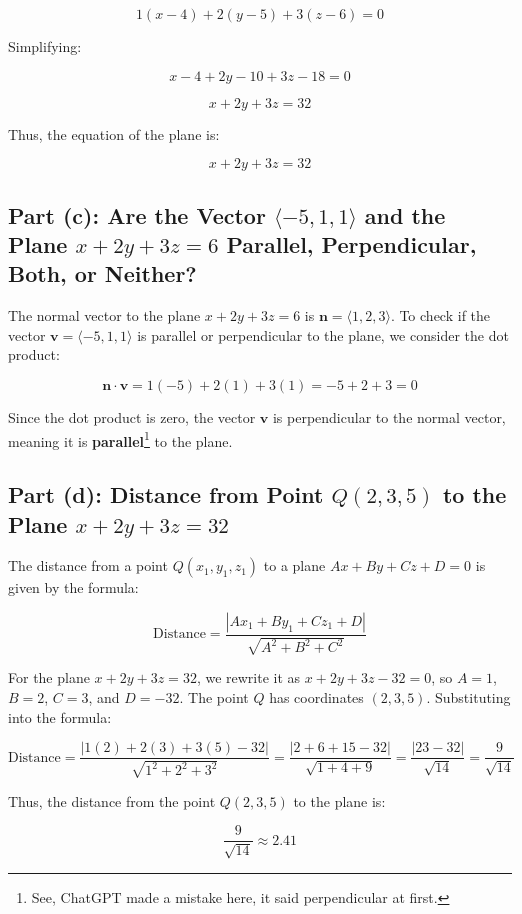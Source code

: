 \documentclass[11pt]{article}
\begin{document}
\[
1(x - 4) + 2(y - 5) + 3(z - 6) = 0
\]

Simplifying:

\[
x - 4 + 2y - 10 + 3z - 18 = 0
\]

\[
x + 2y + 3z = 32
\]

Thus, the equation of the plane is:

\[
x + 2y + 3z = 32
\]

\newpage
\subsection{Part (c): Are the Vector $\langle -5, 1, 1 \rangle$ and the Plane $x + 2y + 3z = 6$ Parallel, Perpendicular, Both, or Neither?}

The normal vector to the plane $x + 2y + 3z = 6$ is $\mathbf{n} = \langle 1, 2, 3 \rangle$. To check if the vector $\mathbf{v} = \langle -5, 1, 1 \rangle$ is parallel or perpendicular to the plane, we consider the dot product:

\[
\mathbf{n} \cdot \mathbf{v} = 1(-5) + 2(1) + 3(1) = -5 + 2 + 3 = 0
\]

Since the dot product is zero, the vector $\mathbf{v}$ is perpendicular to the normal vector, meaning it is \textbf{parallel}\footnote{See, ChatGPT made a mistake here, it said perpendicular at first.} to the plane.

\newpage
\subsection{Part (d): Distance from Point $Q(2, 3, 5)$ to the Plane $x + 2y + 3z = 32$}

The distance from a point $Q(x_1, y_1, z_1)$ to a plane $Ax + By + Cz + D = 0$ is given by the formula:

\[
\text{Distance} = \frac{|A x_1 + B y_1 + C z_1 + D|}{\sqrt{A^2 + B^2 + C^2}}
\]

For the plane $x + 2y + 3z = 32$, we rewrite it as $x + 2y + 3z - 32 = 0$, so $A = 1$, $B = 2$, $C = 3$, and $D = -32$. The point $Q$ has coordinates $(2, 3, 5)$. Substituting into the formula:

\[
\text{Distance} = \frac{|1(2) + 2(3) + 3(5) - 32|}{\sqrt{1^2 + 2^2 + 3^2}} = \frac{|2 + 6 + 15 - 32|}{\sqrt{1 + 4 + 9}} = \frac{|23 - 32|}{\sqrt{14}} = \frac{9}{\sqrt{14}}
\]

Thus, the distance from the point $Q(2, 3, 5)$ to the plane is:

\[
\frac{9}{\sqrt{14}} \approx 2.41
\]
\newpage
\end{document}
